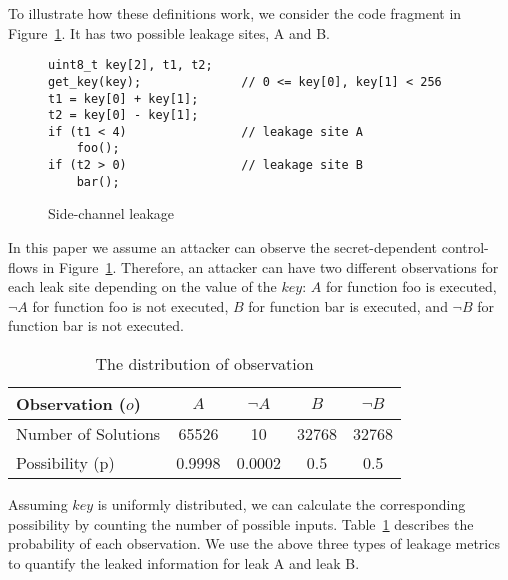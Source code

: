 To illustrate how these definitions work, we consider the code
fragment in Figure~\ref{fig:side-channel}. It has two possible leakage sites, A and B.

\begin{figure}[h!]
\centering
\begin{lstlisting}[xleftmargin=.03\textwidth,xrightmargin=.01\textwidth]
uint8_t key[2], t1, t2;
get_key(key);              // 0 <= key[0], key[1] < 256
t1 = key[0] + key[1];
t2 = key[0] - key[1];
if (t1 < 4)                // leakage site A
    foo();                             
if (t2 > 0)                // leakage site B     
    bar();                             
\end{lstlisting}
\vspace*{-1pt}
    \caption{Side-channel leakage}
    \label{fig:side-channel}
\end{figure}
In this paper we assume an attacker can observe the secret-dependent control-flows in 
Figure~\ref{fig:side-channel}.
Therefore, an attacker can have two different observations for each leak site
depending on the value of the $\mathit{key}$: $A$ for function \textsf{foo} is executed, 
$\neg A$ for function \textsf{foo} is not executed, $B$ for function \textsf{bar} is
executed, and $\neg B$ for function \textsf{bar} is not executed.

\begin{table}[ht]
    \centering\small\footnotesize
    \caption{The distribution of observation}\label{shtable}
    \vspace*{-0pt}
    \begin{tabular}{l|cc|cc}
        \hline
        Observation ($o$)   & $A$ & $\neg A$ & $B$ & $\neg B$ \\ \hline
        Number of Solutions & 65526       & 10        & 32768     & 32768           \\ \hline
        Possibility (p)     & 0.9998      & 0.0002    & 0.5    & 0.5       \\
        \hline
    \end{tabular}
\end{table}

Assuming $\mathit{key}$ is uniformly distributed, we can calculate the corresponding
possibility by counting the number of possible inputs. Table~\ref{shtable}
describes the probability of each observation. We use the above three types of 
leakage metrics to quantify the leaked information for leak A and leak B.

